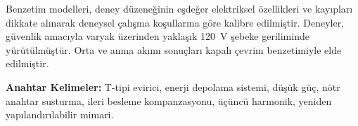 \begin{ozet}
Benzetim modelleri, deney düzeneğinin eşdeğer elektriksel özellikleri ve kayıpları dikkate alınarak deneysel çalışma koşullarına göre kalibre edilmiştir. Deneyler, güvenlik amacıyla varyak üzerinden yaklaşık 120~V şebeke geriliminde yürütülmüştür. Orta ve anma akımı sonuçları kapalı çevrim benzetimiyle elde edilmiştir.

\textbf{Anahtar Kelimeler:} T-tipi evirici, enerji depolama sistemi, düşük güç, nötr anahtar susturma, ileri besleme kompanzasyonu, üçüncü harmonik, yeniden yapılandırılabilir mimari.
\end{ozet}
